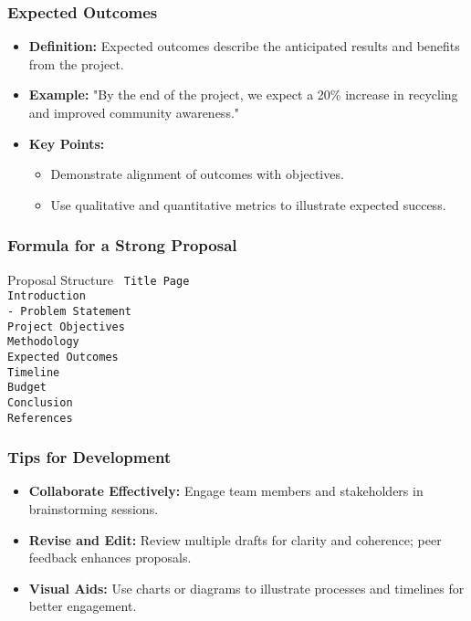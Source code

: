 \documentclass[aspectratio=169]{beamer}
\begin{document}
\begin{frame}[fragile]
    \frametitle{Expected Outcomes}
    \begin{itemize}
        \item \textbf{Definition:} Expected outcomes describe the anticipated results and benefits from the project.
        \item \textbf{Example:} "By the end of the project, we expect a 20\% increase in recycling and improved community awareness."
        \item \textbf{Key Points:}
        \begin{itemize}
            \item Demonstrate alignment of outcomes with objectives.
            \item Use qualitative and quantitative metrics to illustrate expected success.
        \end{itemize}
    \end{itemize}
\end{frame}

\begin{frame}[fragile]
    \frametitle{Formula for a Strong Proposal}
    \begin{block}{Proposal Structure}
      \texttt{
      Title Page \\
      Introduction \\
      \quad - Problem Statement \\
      Project Objectives \\
      Methodology \\
      Expected Outcomes \\
      Timeline \\
      Budget \\
      Conclusion \\
      References
      }
    \end{block}
\end{frame}

\begin{frame}[fragile]
    \frametitle{Tips for Development}
    \begin{itemize}
        \item \textbf{Collaborate Effectively:} Engage team members and stakeholders in brainstorming sessions.
        \item \textbf{Revise and Edit:} Review multiple drafts for clarity and coherence; peer feedback enhances proposals.
        \item \textbf{Visual Aids:} Use charts or diagrams to illustrate processes and timelines for better engagement.
    \end{itemize}
\end{frame}
\end{document}
